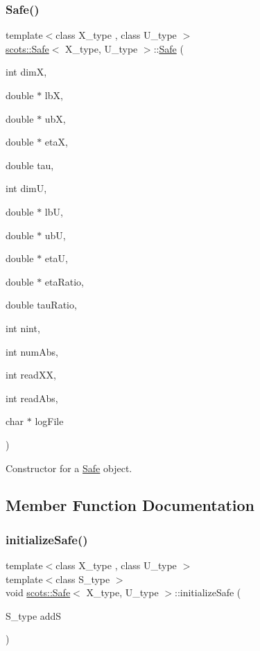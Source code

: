 \subsubsection{\texorpdfstring{Safe()}{Safe()}}
{\footnotesize\ttfamily template$<$class X\+\_\+type , class U\+\_\+type $>$ \\
\hyperlink{classscots_1_1Safe}{scots\+::\+Safe}$<$ X\+\_\+type, U\+\_\+type $>$\+::\hyperlink{classscots_1_1Safe}{Safe} (\begin{DoxyParamCaption}\item[{int}]{dimX,  }\item[{double $\ast$}]{lbX,  }\item[{double $\ast$}]{ubX,  }\item[{double $\ast$}]{etaX,  }\item[{double}]{tau,  }\item[{int}]{dimU,  }\item[{double $\ast$}]{lbU,  }\item[{double $\ast$}]{ubU,  }\item[{double $\ast$}]{etaU,  }\item[{double $\ast$}]{eta\+Ratio,  }\item[{double}]{tau\+Ratio,  }\item[{int}]{nint,  }\item[{int}]{num\+Abs,  }\item[{int}]{read\+XX,  }\item[{int}]{read\+Abs,  }\item[{char $\ast$}]{log\+File }\end{DoxyParamCaption})\hspace{0.3cm}{\ttfamily [inline]}}

Constructor for a \hyperlink{classscots_1_1Safe}{Safe} object. 

\subsection{Member Function Documentation}
\mbox{\label{classscots_1_1Safe_a8255c8172548f64907fedaddfcae9519}} 
\subsubsection{\texorpdfstring{initialize\+Safe()}{initializeSafe()}}
{\footnotesize\ttfamily template$<$class X\+\_\+type , class U\+\_\+type $>$ \\
template$<$class S\+\_\+type $>$ \\
void \hyperlink{classscots_1_1Safe}{scots\+::\+Safe}$<$ X\+\_\+type, U\+\_\+type $>$\+::initialize\+Safe (\begin{DoxyParamCaption}\item[{S\+\_\+type}]{addS }\end{DoxyParamCaption})\hspace{0.3cm}{\ttfamily [inline]}}

